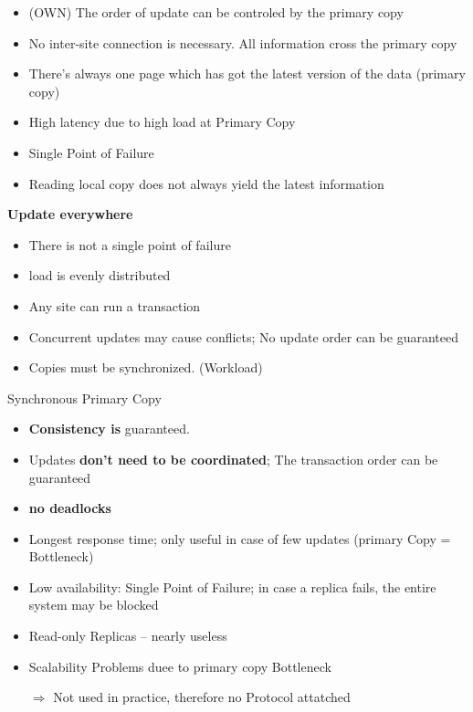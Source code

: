 \documentclass[a4paper,12pt]{article}%
\begin{document}
 {\color[HTML]{9AB299} 
 \begin{itemize}
  \item (OWN) The order of update can be controled by the primary copy
  \item No inter-site connection is necessary. All information cross the primary copy
  \item There's always one page which has got the latest version of the data (primary copy)
 \end{itemize}

 }   
{\color[HTML]{A38C8C}
 \begin{itemize}
  \item High latency due to high load at Primary Copy
  \item Single Point of Failure
  \item Reading local copy does not always yield the latest information
 \end{itemize}
 }

{\bf Update everywhere}

 {\color[HTML]{9AB299} 
 \begin{itemize}
  \item There is not a single point of failure
  \item load is evenly distributed
  \item Any site can run a transaction 
 \end{itemize}

 }   
{\color[HTML]{A38C8C}
 \begin{itemize}
  \item Concurrent updates may cause conflicts; No update order can be guaranteed
  \item Copies must be synchronized. (Workload)
 \end{itemize}
 }
 
 
 Synchronous Primary Copy
 
 {\color[HTML]{9AB299} 
 \begin{itemize}
  \item {\bf Consistency is} guaranteed.
  \item Updates {\bf don't need to be coordinated}; The transaction order can be guaranteed
  \item {\bf no deadlocks}
 \end{itemize}

 }   
{\color[HTML]{A38C8C}
 \begin{itemize}
  \item Longest response time; only useful in case of few updates (primary Copy = Bottleneck)
  \item Low availability: Single Point of Failure; in case a replica fails, the entire system may be blocked
  \item Read-only Replicas -- nearly useless
  \item Scalability Problems duee to primary copy Bottleneck
  \item[$\Rightarrow$] Not used in practice, therefore no Protocol attatched
 \end{itemize}
 }
 
\end{document}
